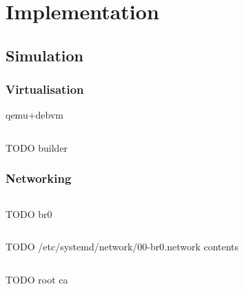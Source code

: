 \chapter{Implementation}\label{Implementation}

\blindtext









\section{Simulation}

\blindtext

\subsection{Virtualisation}

qemu+debvm
\blindtext

\begin{listing}[ht]
\inputminted{bash}{snippets/build.bash}
\caption[Building OpenSSL from source inside build.img with DebVM]{TODO builder}
\end{listing}

\subsection{Networking}

\blindtext

\begin{listing}[ht]
\inputminted{bash}{snippets/br0.bash}
\caption[Connecting QEMU virtual machines using a network bridge]{TODO br0}
\end{listing}

\blindtext

\begin{listing}[ht]
\inputminted{ini}{snippets/br0.ini}
\caption[Static bridge network configuration using systemd]{TODO /etc/systemd/network/00-br0.network contents}
\end{listing}

\blindtext

\begin{listing}[ht]
\inputminted{bash}{snippets/root.bash}
\caption[Generating a new self-signed root CA X.509 certificate using OpenSSL]{TODO root ca}
\end{listing}

\blindtext










